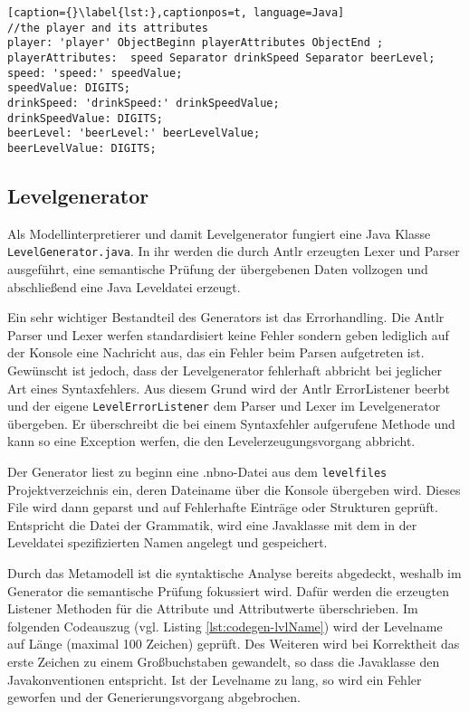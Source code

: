 \begin{lstlisting}[caption={}\label{lst:},captionpos=t, language=Java] 
//the player and its attributes
player: 'player' ObjectBeginn playerAttributes ObjectEnd ;
playerAttributes:  speed Separator drinkSpeed Separator beerLevel;
speed: 'speed:' speedValue;
speedValue: DIGITS;
drinkSpeed: 'drinkSpeed:' drinkSpeedValue;
drinkSpeedValue: DIGITS;
beerLevel: 'beerLevel:' beerLevelValue;
beerLevelValue: DIGITS;
\end{lstlisting}

\subsection{Levelgenerator}

Als Modellinterpretierer und damit Levelgenerator fungiert eine Java Klasse \texttt{LevelGenerator.java}. In ihr werden die durch Antlr erzeugten Lexer und Parser ausgeführt, eine semantische Prüfung der übergebenen Daten vollzogen und abschließend eine Java Leveldatei erzeugt.

Ein sehr wichtiger Bestandteil des Generators ist das Errorhandling. Die Antlr Parser und Lexer werfen standardisiert keine Fehler sondern geben lediglich auf der Konsole eine Nachricht aus, das ein Fehler beim Parsen aufgetreten ist. Gewünscht ist jedoch, dass der Levelgenerator fehlerhaft abbricht bei jeglicher Art eines Syntaxfehlers. Aus diesem Grund wird der Antlr ErrorListener beerbt und der eigene \texttt{LevelErrorListener} dem Parser und Lexer im Levelgenerator übergeben. Er überschreibt die bei einem Syntaxfehler aufgerufene Methode und kann so eine Exception werfen, die den Levelerzeugungsvorgang abbricht.

Der Generator liest zu beginn eine .nbno-Datei aus dem \texttt{levelfiles} Projektverzeichnis ein, deren Dateiname über die Konsole übergeben wird. Dieses File wird dann geparst und auf Fehlerhafte Einträge oder Strukturen geprüft. Entspricht die Datei der Grammatik, wird eine Javaklasse mit dem in der Leveldatei spezifizierten Namen angelegt und gespeichert.

Durch das Metamodell ist die syntaktische Analyse bereits abgedeckt, weshalb im Generator die semantische Prüfung fokussiert wird. Dafür werden die erzeugten Listener Methoden für die Attribute und Attributwerte überschrieben. Im folgenden Codeauszug (vgl. Listing \ref{lst:codegen-lvlName}) wird der Levelname auf Länge (maximal 100 Zeichen) geprüft. Des Weiteren wird bei Korrektheit das erste Zeichen zu einem Großbuchstaben gewandelt, so dass die Javaklasse den Javakonventionen entspricht. Ist der Levelname zu lang, so wird ein Fehler geworfen und der Generierungsvorgang abgebrochen.

